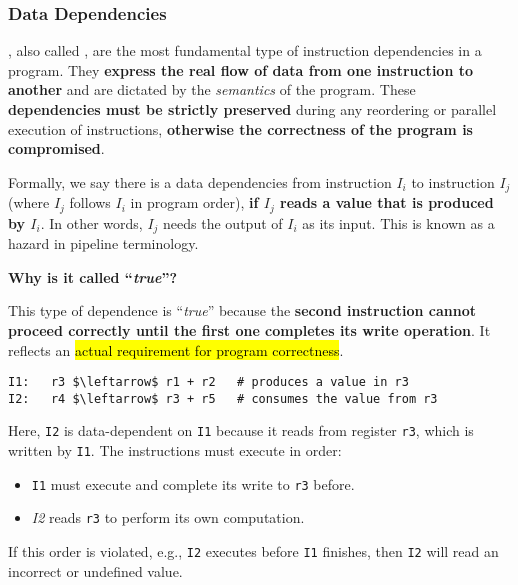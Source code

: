 \subsubsection{Data Dependencies}

, also called , are the most fundamental type of instruction dependencies in a program. They \textbf{express the real flow of data from one instruction to another} and are dictated by the \emph{semantics} of the program. These \textbf{dependencies must be strictly preserved} during any reordering or parallel execution of instructions, \textbf{otherwise the correctness of the program is compromised}.

\highspace
Formally, we say there is a data dependencies from instruction $I_{i}$ to instruction $I_{j}$ (where $I_{j}$ follows $I_{i}$ in program order), \textbf{if $I_{j}$ reads a value that is produced by $I_{i}$}. In other words, $I_{j}$ needs the output of $I_{i}$ as its input. This is known as a  hazard in pipeline terminology.

\highspace
\begin{flushleft}
    \textcolor{Green3}{ \textbf{Why is it called ``\emph{true}''?}}
\end{flushleft}
This type of dependence is ``\emph{true}'' because the \textbf{second instruction cannot proceed correctly until the first one completes its write operation}. It reflects an \hl{actual requirement for program correctness}.

\highspace
\begin{examplebox}
    \begin{lstlisting}[language=riscv, mathescape=true]
I1:   r3 $\leftarrow$ r1 + r2   # produces a value in r3
I2:   r4 $\leftarrow$ r3 + r5   # consumes the value from r3\end{lstlisting}
    Here, \texttt{I2} is data-dependent on \texttt{I1} because it reads from register \texttt{r3}, which is written by \texttt{I1}. The instructions must execute in order:
    \begin{itemize}
        \item \texttt{I1} must execute and complete its write to \texttt{r3} before.
        \item \textsl{I2} reads \texttt{r3} to perform its own computation.
    \end{itemize}
    If this order is violated, e.g., \texttt{I2} executes before \texttt{I1} finishes, then \texttt{I2} will read an incorrect or undefined value.
\end{examplebox}

